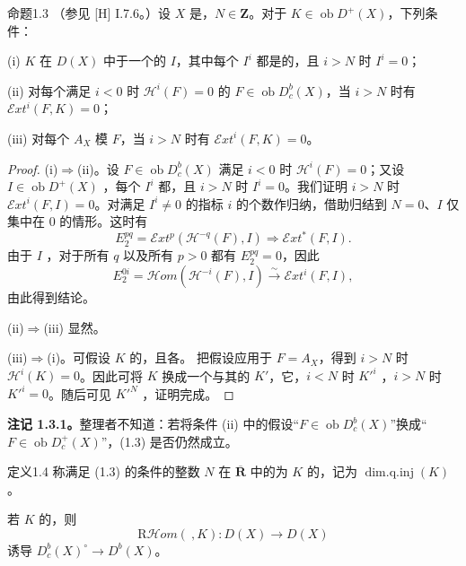 \begin{SGAresult}{命题}{1.3}
（参见 [H] I.7.6。）设 $X$ 是，$N\in\mathbf Z$。对于 $K\in\operatorname{ob}D^+(X)$，下列条件：

(i) $K$ 在 $D(X)$ 中于一个的 $I$，其中每个 $I^i$ 都是的，且 $i>N$ 时 $I^i=0$；

(ii) 对每个满足 $i<0$ 时 $\mathcal H^i(F)=0$ 的 $F\in\operatorname{ob}D_c^b(X)$，当 $i>N$ 时有 $\mathcal Ext^i(F,K)=0$；

(iii) 对每个 $A_X$ 模 $F$，当 $i>N$ 时有 $\mathcal Ext^i(F,K)=0$。
\end{SGAresult}
\begin{proof}
(i)$\Rightarrow$(ii)。设 $F\in\operatorname{ob}D_c^b(X)$ 满足 $i<0$ 时 $\mathcal H^i(F)=0$；又设 $I\in\operatorname{ob}D^+(X)$ ，每个 $I^i$ 都，且 $i>N$ 时 $I^i=0$。我们证明 $i>N$ 时 $\mathcal Ext^i(F,I)=0$。对满足 $I^i\ne0$ 的指标 $i$ 的个数作归纳，借助归结到 $N=0$、$I$ 仅集中在 $0$ 的情形。这时有
\[
 E_2^{pq}=\mathcal Ext^p(\mathcal H^{-q}(F),I)\Longrightarrow\mathcal Ext^*(F,I).
\]
由于 $I$ ，对于所有 $q$ 以及所有 $p>0$ 都有 $E_2^{pq}=0$，因此
\[
 E_2^{0i}=\mathcal Hom(\mathcal H^{-i}(F),I)\xrightarrow{\sim}\mathcal Ext^i(F,I),
\]
由此得到结论。

(ii)$\Rightarrow$(iii) 显然。

(iii)$\Rightarrow$(i)。可假设 $K$ 的，且各。
把假设应用于 $F=A_X$，得到 $i>N$ 时 $\mathcal H^i(K)=0$。因此可将 $K$ 换成一个与其的 $K'$，它，$i<N$ 时 $K'^i$ ，$i>N$ 时 $K'^i=0$。随后可见 $K'^N$ ，证明完成。
\end{proof}
\textbf{注记 1.3.1。}整理者不知道：若将条件 (ii) 中的假设“$F\in\operatorname{ob}D_c^b(X)$”换成“$F\in\operatorname{ob}D_c^+(X)$”，(1.3) 是否仍然成立。

\begin{SGAresult}{定义}{1.4}
称满足 (1.3) 的条件的整数 $N$ 在 $\overline{\mathbf R}$ 中的为 $K$ 的，记为 $\operatorname{dim.q.inj}(K)$。
\end{SGAresult}
若 $K$ 的，则
\[
 \mathrm R\mathcal Hom(\ ,K):D(X)\longrightarrow D(X)
\]
诱导 $D_c^b(X)^\circ\longrightarrow D^b(X)$。

